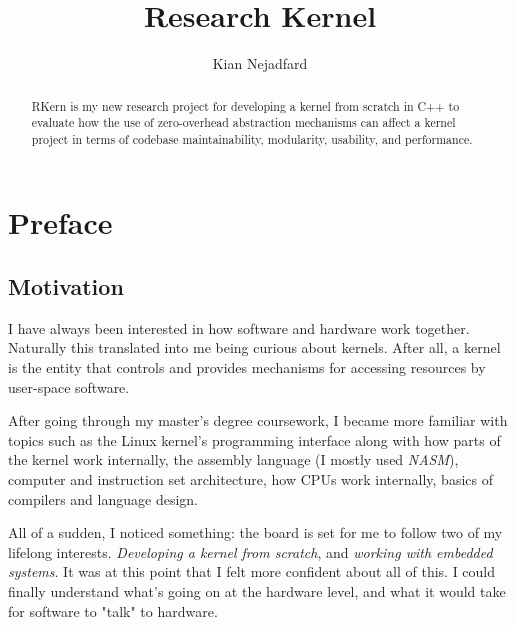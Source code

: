 \documentclass[a4paper,12pt,twoside]{report}
\title{Research Kernel}
\author{Kian Nejadfard}
\begin{document}
    \maketitle

    \begin{abstract}
    	RKern is my new research project for developing a kernel from scratch in C++ to evaluate how the use of zero-overhead abstraction mechanisms can affect a kernel project in terms of codebase maintainability, modularity, usability, and performance.
    \end{abstract}

	\chapter{Preface}

	    \section{Motivation}
	    	I have always been interested in how software and hardware work together. Naturally this translated into me being curious about kernels. After all, a kernel is the entity that controls and provides mechanisms for accessing resources by user-space software.

	    	After going through my master's degree coursework, I became more familiar with topics such as the Linux kernel's programming interface along with how parts of the kernel work internally, the assembly language (I mostly used \textit{NASM}), computer and instruction set architecture, how CPUs work internally, basics of compilers and language design.

	    	All of a sudden, I noticed something: the board is set for me to follow two of my lifelong interests. \textit{Developing a kernel from scratch}, and \textit{working with embedded systems}.
	    	It was at this point that I felt more confident about all of this. I could finally understand what's going on at the hardware level, and what it would take for software to "talk" to hardware.
\end{document}
